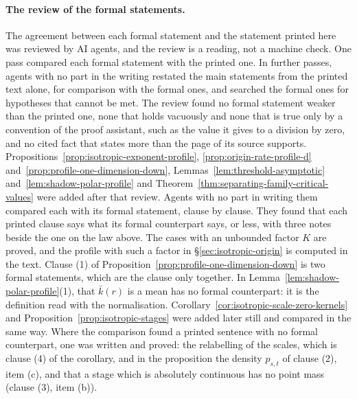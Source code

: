 \paragraph{The review of the formal statements.} The agreement between each formal statement
and the statement printed here was reviewed by AI agents, and the review is a reading, not a
machine check. One pass compared each formal statement with the printed one. In further passes,
agents with no part in the writing restated the main statements from the printed text alone,
for comparison with the formal ones, and searched the formal ones for hypotheses that cannot be
met. The review found no formal statement weaker than the printed one, none that holds
vacuously and none that is true only by a convention of the proof assistant, such as the value
it gives to a division by zero, and no cited fact that states more than the page of its source
supports. Propositions~\ref{prop:isotropic-exponent-profile},
\ref{prop:origin-rate-profile-d} and~\ref{prop:profile-one-dimension-down},
Lemmas~\ref{lem:threshold-asymptotic} and~\ref{lem:shadow-polar-profile} and
Theorem~\ref{thm:separating-family-critical-values} were added after that review. Agents with
no part in writing them compared each with its formal statement, clause by clause. They found
that each printed clause says what its formal counterpart says, or less, with three notes
beside the one on the law above. The cases with an unbounded factor $K$ are proved, and the
profile with such a factor in \S\ref{sec:isotropic-origin} is computed in the text. Clause (1)
of Proposition~\ref{prop:profile-one-dimension-down} is two formal statements, which are the
clause only together. In Lemma~\ref{lem:shadow-polar-profile}(1), that $\bar k(r)$ is a mean
has no formal counterpart: it is the definition read with the normalisation.
Corollary~\ref{cor:isotropic-scale-zero-kernels} and Proposition~\ref{prop:isotropic-stages}
were added later still and compared in the same way. Where the comparison found a printed
sentence with no formal counterpart, one was written and proved: the relabelling of the scales,
which is clause (4) of the corollary, and in the proposition the density $p_{s,t}$ of clause
(2), item (c), and that a stage which is absolutely continuous has no point mass (clause (3),
item (b)).
